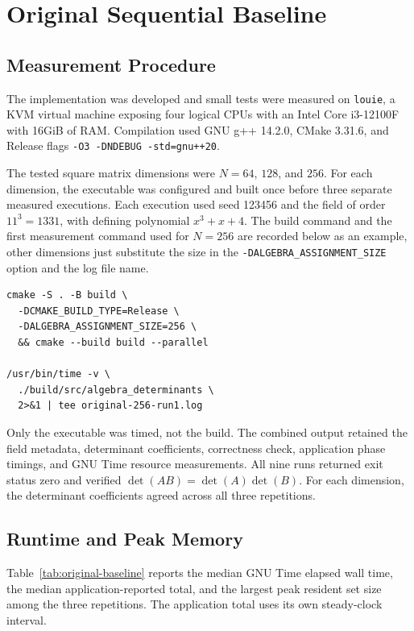 \section{Original Sequential Baseline}
\label{sec:original-baseline}

\subsection{Measurement Procedure}
The implementation was developed and small tests were measured on \texttt{louie}, a KVM virtual
machine exposing four logical CPUs with an Intel Core i3-12100F
with 16GiB of RAM.
Compilation used GNU g++ 14.2.0, CMake 3.31.6, and Release flags
\texttt{-O3 -DNDEBUG -std=gnu++20}.

The tested square matrix dimensions were $N=64$, $128$, and $256$.
For each dimension, the executable was configured and built once before
three separate measured executions. Each execution used seed 123456 and
the field of order $11^3=1331$, with defining polynomial $x^3+x+4$.
The build command and the first measurement command used for $N=256$
are recorded below as an example, other dimensions just substitute 
the size in the \texttt{-DALGEBRA\_ASSIGNMENT\_SIZE} option and the log file name.

\begingroup
\scriptsize
\begin{verbatim}
cmake -S . -B build \
  -DCMAKE_BUILD_TYPE=Release \
  -DALGEBRA_ASSIGNMENT_SIZE=256 \
  && cmake --build build --parallel

/usr/bin/time -v \
  ./build/src/algebra_determinants \
  2>&1 | tee original-256-run1.log
\end{verbatim}
\endgroup

Only the executable was timed, not the build. The combined output retained
the field metadata, determinant coefficients, correctness check, application
phase timings, and GNU Time resource measurements. All nine runs returned
exit status zero and verified $\det(AB)=\det(A)\det(B)$. For each dimension,
the determinant coefficients agreed across all three repetitions.

\subsection{Runtime and Peak Memory}
Table~\ref{tab:original-baseline} reports the median GNU Time elapsed wall
time, the median application-reported total, and the largest peak resident
set size among the three repetitions. 
The application total uses its own steady-clock interval.

